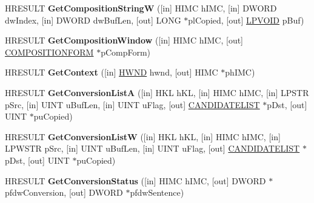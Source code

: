 \begin{DoxyCompactItemize}
H\+R\+E\+S\+U\+LT {\bfseries Get\+Composition\+StringW} (\mbox{[}in\mbox{]} H\+I\+MC h\+I\+MC, \mbox{[}in\mbox{]} D\+W\+O\+RD dw\+Index, \mbox{[}in\mbox{]} D\+W\+O\+RD dw\+Buf\+Len, \mbox{[}out\mbox{]} L\+O\+NG $\ast$pl\+Copied, \mbox{[}out\mbox{]} \hyperlink{interfacevoid}{L\+P\+V\+O\+ID} p\+Buf)
\item 
\mbox{\label{interface_i_active_i_m_m_app_ae40b7698a5b73864ab85659fe61dfa90}} 
H\+R\+E\+S\+U\+LT {\bfseries Get\+Composition\+Window} (\mbox{[}in\mbox{]} H\+I\+MC h\+I\+MC, \mbox{[}out\mbox{]} \hyperlink{struct_c_o_m_p_o_s_i_t_i_o_n_f_o_r_m}{C\+O\+M\+P\+O\+S\+I\+T\+I\+O\+N\+F\+O\+RM} $\ast$p\+Comp\+Form)
\item 
\mbox{\label{interface_i_active_i_m_m_app_a8191c63a0284dae2a629ea64ec398d79}} 
H\+R\+E\+S\+U\+LT {\bfseries Get\+Context} (\mbox{[}in\mbox{]} \hyperlink{interfacevoid}{H\+W\+ND} hwnd, \mbox{[}out\mbox{]} H\+I\+MC $\ast$ph\+I\+MC)
\item 
\mbox{\label{interface_i_active_i_m_m_app_a38db0523edbe1222b39f9d046245986a}} 
H\+R\+E\+S\+U\+LT {\bfseries Get\+Conversion\+ListA} (\mbox{[}in\mbox{]} H\+KL h\+KL, \mbox{[}in\mbox{]} H\+I\+MC h\+I\+MC, \mbox{[}in\mbox{]} L\+P\+S\+TR p\+Src, \mbox{[}in\mbox{]} U\+I\+NT u\+Buf\+Len, \mbox{[}in\mbox{]} U\+I\+NT u\+Flag, \mbox{[}out\mbox{]} \hyperlink{struct_c_a_n_d_i_d_a_t_e_l_i_s_t}{C\+A\+N\+D\+I\+D\+A\+T\+E\+L\+I\+ST} $\ast$p\+Dst, \mbox{[}out\mbox{]} U\+I\+NT $\ast$pu\+Copied)
\item 
\mbox{\label{interface_i_active_i_m_m_app_a26b6ae4c0d72a6546896e35a740903cd}} 
H\+R\+E\+S\+U\+LT {\bfseries Get\+Conversion\+ListW} (\mbox{[}in\mbox{]} H\+KL h\+KL, \mbox{[}in\mbox{]} H\+I\+MC h\+I\+MC, \mbox{[}in\mbox{]} L\+P\+W\+S\+TR p\+Src, \mbox{[}in\mbox{]} U\+I\+NT u\+Buf\+Len, \mbox{[}in\mbox{]} U\+I\+NT u\+Flag, \mbox{[}out\mbox{]} \hyperlink{struct_c_a_n_d_i_d_a_t_e_l_i_s_t}{C\+A\+N\+D\+I\+D\+A\+T\+E\+L\+I\+ST} $\ast$p\+Dst, \mbox{[}out\mbox{]} U\+I\+NT $\ast$pu\+Copied)
\item 
\mbox{\label{interface_i_active_i_m_m_app_aaf08bb29d6b4954b8a7fedea809a8fe4}} 
H\+R\+E\+S\+U\+LT {\bfseries Get\+Conversion\+Status} (\mbox{[}in\mbox{]} H\+I\+MC h\+I\+MC, \mbox{[}out\mbox{]} D\+W\+O\+RD $\ast$pfdw\+Conversion, \mbox{[}out\mbox{]} D\+W\+O\+RD $\ast$pfdw\+Sentence)

\end{DoxyCompactItemize}
